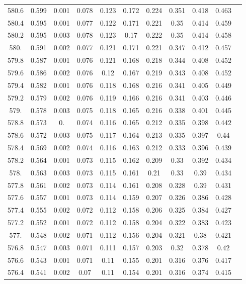 \documentclass[12pt]{ctexart}
\numberwithin{equation}{section}
\begin{document}
\begin{longtable}{ccccccccccc}
580.6	&	0.599	&	0.001	&	0.078	&	0.123	&	0.172	&	0.224	&	0.351	&	0.418	&	0.463	\\
580.4	&	0.595	&	0.001	&	0.077	&	0.122	&	0.171	&	0.221	&	0.35	&	0.414	&	0.459	\\
580.2	&	0.595	&	0.003	&	0.078	&	0.123	&	0.17	&	0.222	&	0.35	&	0.414	&	0.458	\\
580.	&	0.591	&	0.002	&	0.077	&	0.121	&	0.171	&	0.221	&	0.347	&	0.412	&	0.457	\\
579.8	&	0.587	&	0.001	&	0.076	&	0.121	&	0.168	&	0.218	&	0.344	&	0.408	&	0.452	\\
579.6	&	0.586	&	0.002	&	0.076	&	0.12	&	0.167	&	0.219	&	0.343	&	0.408	&	0.452	\\
579.4	&	0.582	&	0.001	&	0.076	&	0.118	&	0.168	&	0.216	&	0.341	&	0.405	&	0.449	\\
579.2	&	0.579	&	0.002	&	0.076	&	0.119	&	0.166	&	0.216	&	0.341	&	0.403	&	0.446	\\
579.	&	0.578	&	0.003	&	0.075	&	0.118	&	0.165	&	0.216	&	0.338	&	0.401	&	0.445	\\
578.8	&	0.573	&	0.	&	0.074	&	0.116	&	0.165	&	0.212	&	0.335	&	0.398	&	0.442	\\
578.6	&	0.572	&	0.003	&	0.075	&	0.117	&	0.164	&	0.213	&	0.335	&	0.397	&	0.44	\\
578.4	&	0.569	&	0.002	&	0.074	&	0.116	&	0.163	&	0.212	&	0.333	&	0.396	&	0.439	\\
578.2	&	0.564	&	0.001	&	0.073	&	0.115	&	0.162	&	0.209	&	0.33	&	0.392	&	0.434	\\
578.	&	0.563	&	0.003	&	0.073	&	0.115	&	0.161	&	0.21	&	0.33	&	0.39	&	0.434	\\
577.8	&	0.561	&	0.002	&	0.073	&	0.114	&	0.161	&	0.208	&	0.328	&	0.39	&	0.431	\\
577.6	&	0.557	&	0.001	&	0.073	&	0.114	&	0.159	&	0.207	&	0.326	&	0.386	&	0.428	\\
577.4	&	0.555	&	0.002	&	0.072	&	0.112	&	0.158	&	0.206	&	0.325	&	0.384	&	0.427	\\
577.2	&	0.552	&	0.001	&	0.072	&	0.112	&	0.158	&	0.204	&	0.322	&	0.383	&	0.423	\\
577.	&	0.548	&	0.002	&	0.071	&	0.112	&	0.156	&	0.204	&	0.321	&	0.38	&	0.421	\\
576.8	&	0.547	&	0.003	&	0.071	&	0.111	&	0.157	&	0.203	&	0.32	&	0.378	&	0.42	\\
576.6	&	0.543	&	0.001	&	0.071	&	0.11	&	0.155	&	0.201	&	0.316	&	0.376	&	0.417	\\
576.4	&	0.541	&	0.002	&	0.07	&	0.11	&	0.154	&	0.201	&	0.316	&	0.374	&	0.415	\\

\end{longtable}
\end{document}

